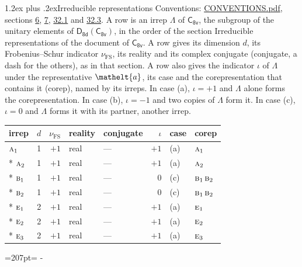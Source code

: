 \documentclass[10pt,a4paper]{article}
\makeatletter
\renewcommand\section{\@startsection{section}{1}{\z@}{-3ex plus -1ex minus -.2ex}%
  {1.2ex plus .2ex}{\normalfont\large\sffamily\bfseries\color{parttitle}}}
\newcommand{\needspace}[1]{\par\penalty-100\begingroup\dimen0=#1\relax\dimen2=\pagegoal
  \advance\dimen2-\pagetotal\ifdim\dimen0>\dimen2\relax\ifdim\dimen2>0pt\vfil\break\fi\fi
  \endgroup}
\numberwithin{equation}{section}
\newcommand{\eltfont}[1]{{\let\sigma\eltsigma\mathelt{#1}}}
\newcommand{\grp}[1]{\mathsf{#1}}
\newcommand{\irr}[1]{\text{\normalfont\scshape #1}}
\newcommand{\elt}[1]{\eltfont{#1}}
\newcommand{\fsind}{\nu_{\mathrm{FS}}}
\makeatother
\begin{document}
\section{Irreducible representations}\label{s:irreps}
Conventions: \href{../../CONVENTIONS.pdf}{CONVENTIONS.pdf}, sections \href{../../../rotation/CONVENTIONS.pdf\#conv.6}{6}, \href{../../../rotation/CONVENTIONS.pdf\#conv.7}{7}, \href{../../CONVENTIONS.pdf\#conv.32.1}{32.1} and \href{../../CONVENTIONS.pdf\#conv.32.3}{32.3}.
\leavevmode\label{n:irrep.Delta}A row is an irrep $\Lambda$ of $\grp{C_{8v}}$, the subgroup of the unitary elements of $\grp{D_{8d}}(\grp{C_{8v}})$, in the order of the section Irreducible representations of the document of \href{../../../rotation/data/pdf/C8v.pdf}{$\grp{C_{8v}}$}. \label{n:index.dimension}\label{n:index.frobenius}\label{n:head.irrep}\label{n:head.reality}\label{n:head.conjugate}A row gives its dimension $d$, its Frobenius--Schur indicator $\fsind$, its reality and its complex conjugate (conjugate, a dash for the others), as in that section. \label{n:head.case.corep}\label{n:head.corep}A row also gives the indicator $\iota$ of $\Lambda$ under the representative $\elt{a}$, its case and the corepresentation that contains it (corep), named by its irreps. In case (a), $\iota = +1$ and $\Lambda$ alone forms the corepresentation. In case (b), $\iota = -1$ and two copies of $\Lambda$ form it. In case (c), $\iota = 0$ and $\Lambda$ forms it with its partner, another irrep.
\setlength{\emergencystretch}{2em}\par\setlength{\emergencystretch}{0pt}
{\small\renewcommand{\arraystretch}{1.25}\setlength{\tabcolsep}{4pt}\begin{longtable}{@{}lrrllrll@{}}\toprule
irrep & $d$ & $\fsind$ & reality & conjugate & $\iota$ & case & corep\\\midrule\endhead
\bottomrule\endfoot\endlastfoot
$\irr{a}_{1}$ & 1 & $+1$ & real & --- & $+1$ & (a) & $\irr{a}_{1}$\\*
$\irr{a}_{2}$ & 1 & $+1$ & real & --- & $+1$ & (a) & $\irr{a}_{2}$\\*
$\irr{b}_{1}$ & 1 & $+1$ & real & --- & $0$ & (c) & $\irr{b}_{1}\,\irr{b}_{2}$\\*
$\irr{b}_{2}$ & 1 & $+1$ & real & --- & $0$ & (c) & $\irr{b}_{1}\,\irr{b}_{2}$\\*
$\irr{e}_{1}$ & 2 & $+1$ & real & --- & $+1$ & (a) & $\irr{e}_{1}$\\*
$\irr{e}_{2}$ & 2 & $+1$ & real & --- & $+1$ & (a) & $\irr{e}_{2}$\\*
$\irr{e}_{3}$ & 2 & $+1$ & real & --- & $+1$ & (a) & $\irr{e}_{3}$\\
\bottomrule\end{longtable}}
\needspace{207pt}
\end{document}
